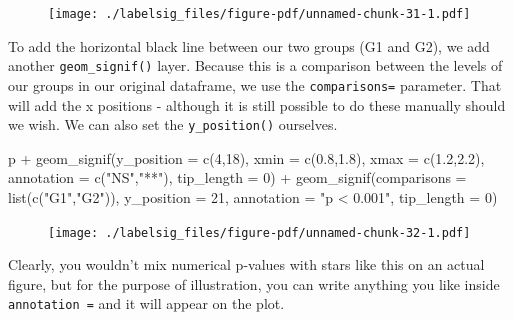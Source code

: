 \documentclass[
  letterpaper,
  DIV=11,
  numbers=noendperiod]{scrreprt}
\newenvironment{Shaded}{\begin{snugshade}}{\end{snugshade}}
\newcommand{\AttributeTok}[1]{\textcolor[rgb]{0.40,0.45,0.13}{#1}}
\newcommand{\DecValTok}[1]{\textcolor[rgb]{0.68,0.00,0.00}{#1}}
\newcommand{\FloatTok}[1]{\textcolor[rgb]{0.68,0.00,0.00}{#1}}
\newcommand{\FunctionTok}[1]{\textcolor[rgb]{0.28,0.35,0.67}{#1}}
\newcommand{\NormalTok}[1]{\textcolor[rgb]{0.00,0.23,0.31}{#1}}
\newcommand{\SpecialCharTok}[1]{\textcolor[rgb]{0.37,0.37,0.37}{#1}}
\newcommand{\StringTok}[1]{\textcolor[rgb]{0.13,0.47,0.30}{#1}}
\begin{document}
\begin{figure}[H]

{\centering \texttt{[image: ./labelsig\_files/figure-pdf/unnamed-chunk-31-1.pdf]}

}

\end{figure}

To add the horizontal black line between our two groups (G1 and G2), we
add another \texttt{geom\_signif()} layer. Because this is a comparison
between the levels of our groups in our original dataframe, we use the
\texttt{comparisons=} parameter. That will add the x positions -
although it is still possible to do these manually should we wish. We
can also set the \texttt{y\_position()} ourselves.

\begin{Shaded}
\begin{Highlighting}[]
\NormalTok{p }\SpecialCharTok{+} 
  \FunctionTok{geom\_signif}\NormalTok{(}\AttributeTok{y\_position =} \FunctionTok{c}\NormalTok{(}\DecValTok{4}\NormalTok{,}\DecValTok{18}\NormalTok{), }
              \AttributeTok{xmin =} \FunctionTok{c}\NormalTok{(}\FloatTok{0.8}\NormalTok{,}\FloatTok{1.8}\NormalTok{), }
              \AttributeTok{xmax =} \FunctionTok{c}\NormalTok{(}\FloatTok{1.2}\NormalTok{,}\FloatTok{2.2}\NormalTok{), }
              \AttributeTok{annotation =} \FunctionTok{c}\NormalTok{(}\StringTok{"NS"}\NormalTok{,}\StringTok{"**"}\NormalTok{),}
              \AttributeTok{tip\_length =} \DecValTok{0}\NormalTok{) }\SpecialCharTok{+}
  \FunctionTok{geom\_signif}\NormalTok{(}\AttributeTok{comparisons =} \FunctionTok{list}\NormalTok{(}\FunctionTok{c}\NormalTok{(}\StringTok{"G1"}\NormalTok{,}\StringTok{"G2"}\NormalTok{)), }
              \AttributeTok{y\_position =} \DecValTok{21}\NormalTok{,}
              \AttributeTok{annotation =} \StringTok{"p \textless{} 0.001"}\NormalTok{,}
              \AttributeTok{tip\_length =} \DecValTok{0}\NormalTok{) }
\end{Highlighting}
\end{Shaded}

\begin{figure}[H]

{\centering \texttt{[image: ./labelsig\_files/figure-pdf/unnamed-chunk-32-1.pdf]}

}

\end{figure}

Clearly, you wouldn't mix numerical p-values with stars like this on an
actual figure, but for the purpose of illustration, you can write
anything you like inside \texttt{annotation\ =} and it will appear on
the plot.
\end{document}
